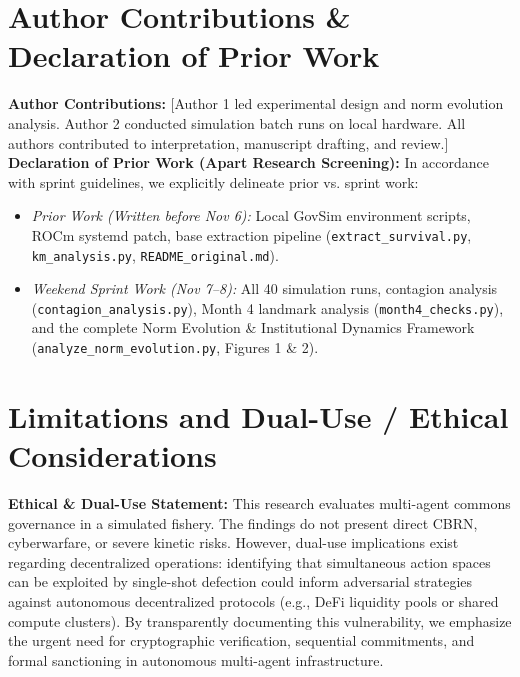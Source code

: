 ﻿\documentclass[11pt,a4paper]{article}
\begin{document}
\section*{Author Contributions \& Declaration of Prior Work}
\textbf{Author Contributions:} [Author 1 led experimental design and norm evolution analysis. Author 2 conducted simulation batch runs on local hardware. All authors contributed to interpretation, manuscript drafting, and review.] \\
\textbf{Declaration of Prior Work (Apart Research Screening):} In accordance with sprint guidelines, we explicitly delineate prior vs. sprint work:
\begin{itemize}[leftmargin=*,itemsep=1pt]
    \item \textit{Prior Work (Written before Nov 6):} Local GovSim environment scripts, ROCm systemd patch, base extraction pipeline (\texttt{extract\_survival.py}, \texttt{km\_analysis.py}, \texttt{README\_original.md}).
    \item \textit{Weekend Sprint Work (Nov 7--8):} All 40 simulation runs, contagion analysis (\texttt{contagion\_analysis.py}), Month 4 landmark analysis (\texttt{month4\_checks.py}), and the complete Norm Evolution \& Institutional Dynamics Framework (\texttt{analyze\_norm_evolution.py}, Figures 1 \& 2).
\end{itemize}

\section*{Limitations and Dual-Use / Ethical Considerations}
\textbf{Ethical \& Dual-Use Statement:} This research evaluates multi-agent commons governance in a simulated fishery. The findings do not present direct CBRN, cyberwarfare, or severe kinetic risks. However, dual-use implications exist regarding decentralized operations: identifying that simultaneous action spaces can be exploited by single-shot defection could inform adversarial strategies against autonomous decentralized protocols (e.g., DeFi liquidity pools or shared compute clusters). By transparently documenting this vulnerability, we emphasize the urgent need for cryptographic verification, sequential commitments, and formal sanctioning in autonomous multi-agent infrastructure.
\end{document}
